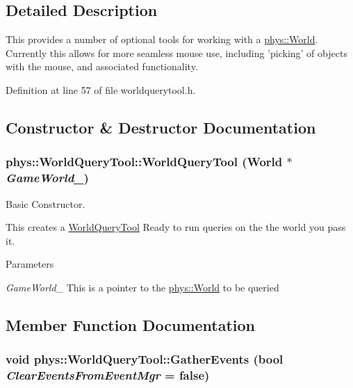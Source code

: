 \subsection{Detailed Description}
This provides a number of optional tools for working with a \hyperlink{classphys_1_1World}{phys::World}. Currently this allows for more seamless mouse use, including 'picking' of objects with the mouse, and associated functionality. 

Definition at line 57 of file worldquerytool.h.



\subsection{Constructor \& Destructor Documentation}
\hypertarget{classphys_1_1WorldQueryTool_a6b156ab7ea6236402c40467da7f11c0d}{
\subsubsection[{WorldQueryTool}]{\setlength{\rightskip}{0pt plus 5cm}phys::WorldQueryTool::WorldQueryTool ({\bf World} $\ast$ {\em GameWorld\_\-})}}
\label{d8/d69/classphys_1_1WorldQueryTool_a6b156ab7ea6236402c40467da7f11c0d}


Basic Constructor. 

This creates a \hyperlink{classphys_1_1WorldQueryTool}{WorldQueryTool} Ready to run queries on the the world you pass it. 
\begin{DoxyParams}{Parameters}
\item[{\em GameWorld\_\-}]This is a pointer to the \hyperlink{classphys_1_1World}{phys::World} to be queried \end{DoxyParams}


\subsection{Member Function Documentation}
\hypertarget{classphys_1_1WorldQueryTool_ae387ff047f3cdf408d8959b8cbf4cc57}{
\subsubsection[{GatherEvents}]{\setlength{\rightskip}{0pt plus 5cm}void phys::WorldQueryTool::GatherEvents (bool {\em ClearEventsFromEventMgr} = {\ttfamily false})}}
\label{d8/d69/classphys_1_1WorldQueryTool_ae387ff047f3cdf408d8959b8cbf4cc57}


